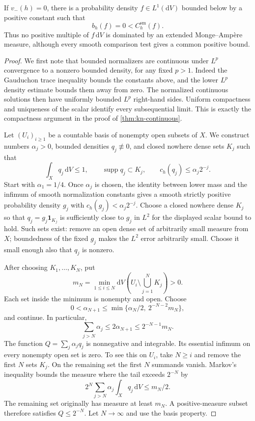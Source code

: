 \begin{theorem}\label{thm:smooth-tests-insufficient}
If $v_-(h)=0$, there is a probability density $f\in L^1(\mathrm{d}V)$ bounded below by a positive constant such that
\[
 b_h(f)=0<C_h^{\mathrm{sm}}(f).
\]
Thus no positive multiple of $f\,\mathrm{d}V$ is dominated by an extended Monge--Amp\`ere measure, although every smooth comparison test gives a common positive bound.
\end{theorem}
\begin{proof}
We first note that bounded normalizers are continuous under $L^p$ convergence to a nonzero bounded density, for any fixed $p>1$. Indeed the Gauduchon trace inequality bounds the constants above, and the lower $L^p$ density estimate bounds them away from zero. The normalized continuous solutions then have uniformly bounded $L^p$ right-hand sides. Uniform compactness and uniqueness of the scalar identify every subsequential limit. This is exactly the compactness argument in the proof of \cref{thm:kn-continuous}.

Let $(U_i)_{i\geq1}$ be a countable basis of nonempty open subsets of $X$. We construct numbers $\alpha_j>0$, bounded densities $q_j\not\equiv0$, and closed nowhere dense sets $K_j$ such that
\[
 \int_Xq_j\,\mathrm{d}V\leq1,\qquad
 \operatorname{supp}q_j\subset K_j,\qquad
 c_h(q_j)\leq\alpha_j2^{-j}.
\]
Start with $\alpha_1=1/4$. Once $\alpha_j$ is chosen, the identity between lower mass and the infimum of smooth normalization constants gives a smooth strictly positive probability density $g_j$ with $c_h(g_j)<\alpha_j2^{-j}$. Choose a closed nowhere dense $K_j$ so that $q_j=g_j\mathbf1_{K_j}$ is sufficiently close to $g_j$ in $L^2$ for the displayed scalar bound to hold. Such sets exist: remove an open dense set of arbitrarily small measure from $X$; boundedness of the fixed $g_j$ makes the $L^2$ error arbitrarily small. Choose it small enough also that $q_j$ is nonzero.

After choosing $K_1,\ldots,K_N$, put
\[
 m_N=\min_{1\leq i\leq N}
    \mathrm{d}V\left(U_i\setminus\bigcup_{j=1}^NK_j\right)>0.
\]
Each set inside the minimum is nonempty and open. Choose
\[
 0<\alpha_{N+1}\leq
       \min\{\alpha_N/2,\ 2^{-N-2}m_N\},
\]
and continue. In particular,
\[
 \sum_{j>N}\alpha_j\leq2\alpha_{N+1}
             \leq2^{-N-1}m_N.
\]
The function $Q=\sum_j\alpha_jq_j$ is nonnegative and integrable. Its essential infimum on every nonempty open set is zero. To see this on $U_i$, take $N\geq i$ and remove the first $N$ sets $K_j$. On the remaining set the first $N$ summands vanish. Markov's inequality bounds the measure where the tail exceeds $2^{-N}$ by
\[
 2^N\sum_{j>N}\alpha_j\int_Xq_j\,\mathrm{d}V
       \leq m_N/2.
\]
The remaining set originally has measure at least $m_N$. A positive-measure subset therefore satisfies $Q\leq2^{-N}$. Let $N\to\infty$ and use the basis property.


\end{proof}
